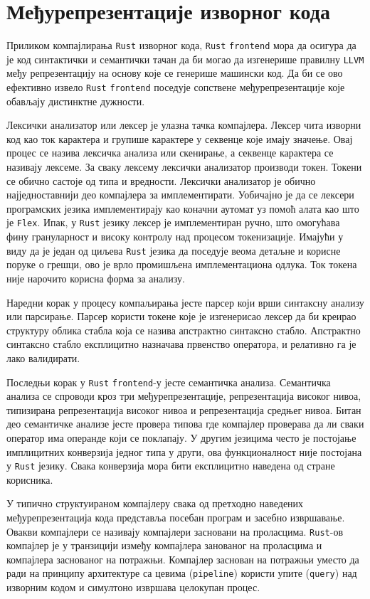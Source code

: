 \section{Међурепрезентације изворног кода}

Приликом компајлирања \verb|Rust| изворног кода, \verb|Rust| \verb|frontend| мора да осигура да је 
код синтактички и семантички тачан да би могао да изгенерише правилну \verb|LLVM| међу репрезентацију 
на основу које се генерише машински код. Да би се ово ефективно извело \verb|Rust| \verb|frontend| поседује 
сопствене међурепрезентације које обављају дистинктне дужности. 

Лексички анализатор или лексер је улазна тачка компајлера. Лексер чита изворни код као ток карактера и групише карактере 
у секвенце које имају значење. Овај процес се назива лексичка анализа или скенирање, а секвенце карактера се називају лексеме. 
За сваку лексему лексички анализатор производи токен. Токени се обично састоје од типа и вредности.
Лексички анализатор је обично најједноставнији део компајлера за имплементирати. 
Уобичајно је да се лексери програмских језика имплементирају као коначни аутомат уз помоћ алата као што 
је \verb|Flex|. Ипак, у \verb|Rust| језику лексер је имплементиран ручно, што омогућава фину грануларност 
и високу контролу над процесом токенизације. Имајући у виду да је један од циљева \verb|Rust| језика 
да поседује веома детаљне и корисне поруке о грешци, ово је врло промишљена имплементациона одлука. 
Ток токена није нарочито корисна форма за анализу.

Наредни корак у процесу компаљирања јесте парсер који врши синтаксну анализу или парсирање. 
Парсер користи токене које је изгенерисао лексер да би креирао структуру облика стабла која се назива 
апстрактно синтаксно стабло. Апстрактно синтаксно стабло експлицитно назначава првенство оператора,
и релативно га је лако валидирати.

Последњи корак у \verb|Rust| \verb|frontend|-у јесте семантичка анализа. Семантичка анализа се спроводи 
кроз три међурепрезентације, репрезентација високог нивоа, типизирана репрезентација високог нивоа
и репрезентација средњег нивоа. Битан део семантичке анализе јесте провера типова где компајлер проверава 
да ли сваки оператор има операнде који се поклапају. У другим језицима често је постојање имплицитних 
конверзија једног типа у други, ова функционалност није постојана у \verb|Rust| језику. Свака конверзија 
мора бити експлицитно наведена од стране корисника.

У типично структуираном компајлеру свака од претходно наведених међурепрезентација кода представља 
посебан програм и засебно извршавање. Овакви компајлери се називају 
компајлери засновани на проласцима. \verb|Rust|-ов компајлер је у транзицији између 
компајлера занованог на проласцима и компајлера заснованог на потражњи. Компајлер 
заснован на потражњи уместо да ради на принципу архитектуре са цевима (\verb|pipeline|)
користи упите (\verb|query|) над изворним кодом и симултоно извршава целокупан процес.

